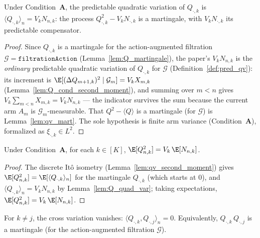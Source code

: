 \begin{lemma}\label{lem:Q_quad_var}
\leanok
{}
Under Condition~\textbf{A}, the predictable quadratic variation of $Q_{\cdot,k}$ is
$\langle Q_{\cdot,k}\rangle_n = V_k N_{n,k}$: the process $Q_{\cdot,k}^2 - V_k N_{\cdot,k}$ is a
martingale, with $V_k N_{\cdot,k}$ its predictable compensator.
\end{lemma}

\begin{proof}\leanok
{}
Since $Q_{\cdot,k}$ is a martingale for the action-augmented filtration
$\mathcal{G} = \texttt{filtrationAction}$ (Lemma~\ref{lem:Q_martingale}), the paper's
$V_k N_{n,k}$ is the \emph{ordinary} predictable quadratic variation of $Q_{\cdot,k}$ for
$\mathcal{G}$ (Definition~\ref{def:pred_qv}): its increment is
$\E[(\Delta Q_{m+1,k})^2\mid\mathcal{G}_m] = V_k X_{m,k}$
(Lemma~\ref{lem:Q_cond_second_moment}), and summing over $m<n$ gives
$V_k\sum_{m<n} X_{m,k} = V_k N_{n,k}$ --- the indicator survives the sum because the current
arm $A_m$ is $\mathcal{G}_m$-measurable. That $Q^2-\langle Q\rangle$ is a martingale (for
$\mathcal{G}$) is Lemma~\ref{lem:qv_mart}. The sole hypothesis is finite arm variance
(Condition~\textbf{A}), formalized as $\xi_{\cdot,k}\in L^2$.
\end{proof}

\begin{lemma}\label{lem:Q_second_moment}
\leanok
{}
Under Condition~\textbf{A}, for each $k \in [K]$,
$\E[Q_{n,k}^2] = V_k\,\E[N_{n,k}]$.
\end{lemma}

\begin{proof}\leanok
{}
The discrete Itô isometry (Lemma~\ref{lem:qv_second_moment}) gives
$\E[Q_{n,k}^2] = \E[\langle Q_{\cdot,k}\rangle_n]$ for the martingale $Q_{\cdot,k}$ (which starts at
$0$), and $\langle Q_{\cdot,k}\rangle_n = V_k N_{n,k}$ by Lemma~\ref{lem:Q_quad_var}; taking
expectations, $\E[Q_{n,k}^2] = V_k\,\E[N_{n,k}]$.
\end{proof}

\begin{lemma}\label{lem:Q_cross_var}
\leanok
{}
For $k \ne j$, the cross variation vanishes: $\langle Q_{\cdot,k}, Q_{\cdot,j}\rangle_n = 0$.
Equivalently, $Q_{\cdot,k}\,Q_{\cdot,j}$ is a martingale (for the action-augmented filtration
$\mathcal{G}$).
\end{lemma}

